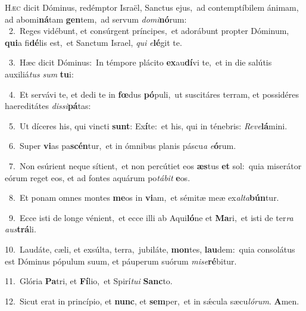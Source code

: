\lettrine{\initial\textcolor{\initialcolor}{H}}{æc} dicit Dóminus, redémptor Israël, Sanctus ejus,~\dagger ad contemptíbilem ánimam, ad abomi\-\textbf{ná}\-tam \textbf{gen}\-tem,~\star ad servum \textit{do}\-\textit{mi}\textbf{nó}rum:\\
{\numbfont\textcolor{\numbcolor}{~2.}}~Reges vidébunt, et consúrgent príncipes,~\dagger et adorábunt propter Dóminum, \textbf{qui}\-a fi\-\textbf{dé}\-lis est,~\star et Sanctum Israel, \textit{qui} \textit{e}\-\textbf{lé}git te.\par
{\numbfont\textcolor{\numbcolor}{~3.}}~Hæc dicit Dóminus:~\dagger In témpore plácito \textbf{ex}\-au\-\textbf{dí}\-vi te,~\star et in die salútis auxiliá\textit{tus} \textit{sum} \textbf{tu}\-i:\par
{\numbfont\textcolor{\numbcolor}{~4.}}~Et servávi te, et dedi te in \textbf{fœ}\-dus \textbf{pó}\-puli,~\star ut suscitáres terram, et possidéres haereditátes \textit{dis}\-\textit{si}\textbf{pá}tas:\par
{\numbfont\textcolor{\numbcolor}{~5.}}~Ut díceres his, qui vincti \textbf{sunt}\-: Ex\-\textbf{í}\-te:~\star et his, qui in ténebris: \textit{Re}\-\textit{ve}\textbf{lá}mini.\par
{\numbfont\textcolor{\numbcolor}{~6.}}~Super \textbf{vi}\-as pa\-\textbf{scén}\-tur,~\star et in ómnibus planis páscu\textit{a} \textit{e}\-\textbf{ó}rum.\par
{\numbfont\textcolor{\numbcolor}{~7.}}~Non esúrient neque sítient,~\dagger et non percútiet eos \textbf{æs}\-tus \textbf{et} sol:~\star quia miserátor eórum reget eos, et ad fontes aquárum po\-\textit{tá}\-\textit{bit} \textbf{e}\-os.\par
{\numbfont\textcolor{\numbcolor}{~8.}}~Et ponam omnes montes \textbf{me}\-os in \textbf{vi}\-am,~\star et sémitæ meæ ex\-\textit{al}\-\textit{ta}\textbf{bún}tur.\par
{\numbfont\textcolor{\numbcolor}{~9.}}~Ecce isti de longe vénient,~\dagger et ecce illi ab Aqui\-\textbf{ló}\-ne et \textbf{Ma}\-ri,~\star et isti de ter\textit{ra} \textit{aus}\-\textbf{trá}li.\par
{\numbfont\textcolor{\numbcolor}{10.}}~Laudáte, cæli, et exsúlta, terra,~\dagger jubiláte, \textbf{mon}\-tes, \textbf{lau}\-dem:~\star quia consolátus est Dóminus pópulum suum, et páuperum suórum \textit{mi}\-\textit{se}\textbf{ré}bitur.\par
{\numbfont\textcolor{\numbcolor}{11.}}~Glória \textbf{Pa}\-tri, et \textbf{Fí}\-lio,~\star et Spirí\-\textit{tu}\-\textit{i} \textbf{Sanc}\-to.\par
{\numbfont\textcolor{\numbcolor}{12.}}~Sicut erat in princípio, et \textbf{nunc}\-, et \textbf{sem}\-per,~\star et in sǽcula sæcu\-\textit{ló}\-\textit{rum}. \textbf{A}\-men.\par
